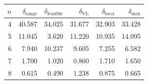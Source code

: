 \begin{tabular}{rrrrrr}
\toprule
$n$ & $\delta_{\mathrm{range}}$ & $\delta_{\mathrm{feasible}}$ & $\delta_{\mathrm{VL}}$ & $\delta_{\mathrm{local}}$ & $\delta_{\mathrm{max}}$ \\
\midrule
4 & 40.587 & 34.025 & 31.677 & 32.903 & 33.428 \\
5 & 11.045 & 3.620 & 11.220 & 10.935 & 14.095 \\
6 & 7.940 & 10.237 & 9.605 & 7.255 & 6.582 \\
7 & 1.700 & 1.020 & 0.860 & 1.710 & 1.650 \\
8 & 0.615 & 0.490 & 1.238 & 0.875 & 0.665 \\
\bottomrule
\end{tabular}
